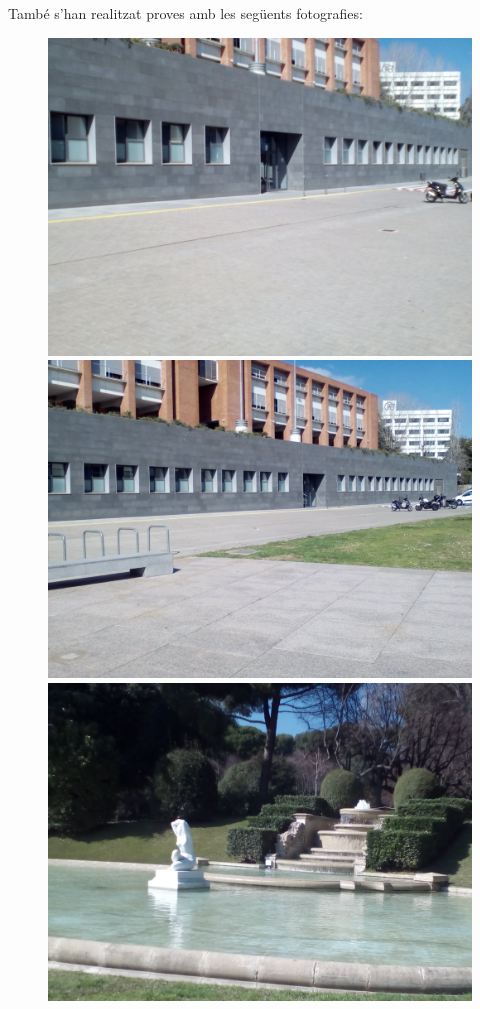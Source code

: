 		\noindent
		També s'han realitzat proves amb les següents fotografies:

		\begin{figure}[!htb]
				\includegraphics[width=\linewidth]{images/experiments/uni1}
				\label{fig:awesome_image1}
			\endminipage\hfill
				\includegraphics[width=\linewidth]{images/experiments/uni2}
				\label{fig:awesome_image2}
			\endminipage\hfill
				\includegraphics[width=\linewidth]{images/experiments/jardi_2}

\end{figure}
